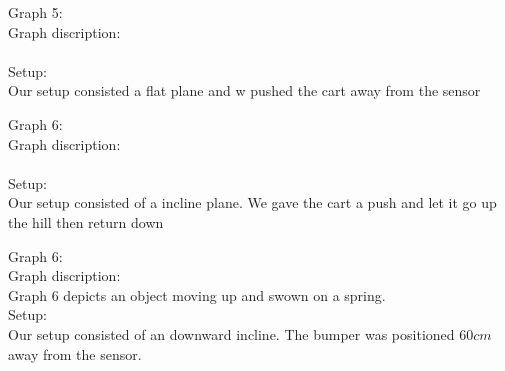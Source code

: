 \documentclass[12pt, letterpaper]{article}
\begin{document}
  \large{Graph 5:}\\
  \large{Graph discription:}\\
  \\
  \large{Setup:}\\
  Our setup consisted a flat plane and w pushed the cart away from the sensor

  \large{Graph 6:}\\
  \large{Graph discription:}\\
  \\
  \large{Setup:}\\
  Our setup consisted of a incline plane. We gave the cart a push and let it go up the hill then return down

  \large{Graph 6:}\\
  \large{Graph discription:}\\
  Graph 6 depicts an object moving up and swown on a spring.\\
  \large{Setup:}\\
  Our setup consisted of an downward incline. The bumper was positioned $60cm$ away from the sensor.  









\end{document}
